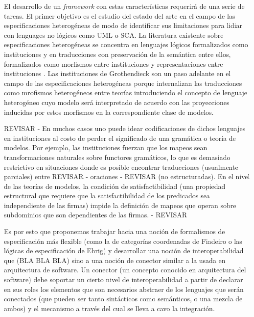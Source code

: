 \documentclass{article}
\begin{document}
  El desarrollo de un \emph{framework} con estas caracter\'isticas requerir\'a de una serie de tareas. El primer objetivo es el estudio del estado del arte en el campo de las especificaciones heterog\'eneas de modo de identificar sus limitaciones para lidiar con lenguages no l\'ogicos como UML o SCA. La literatura existente sobre especificaciones heterog\'eneas se concentra en lenguajes l\'ogicos formalizados como instituciones \cite{goguen:cmwlp84} y en traducciones con preservaci\'on de la sem\'antica entre ellos, formalizados como morfismos entre instituciones \cite{goguen:jacm-39_1} y representaciones entre instituciones \cite{tarlecki:sadt-rtdts95}. Las instituciones de Grothendieck \cite{diaconescu:acs-10_4} son un paso adelante en el campo de las especificaciones heterog\'eneas porque internalizan las traducciones como mrofismos heterog\'eneos entre teor\'ias introduciendo el concepto de lenguaje heterog\'eneo cuyo modelo ser\'a interpretado de acuerdo con las proyecciones inducidas por estos 
morfismos en la correspondiente clase de modelos.
  
  REVISAR -
  En muchos casos uno puede idear codificaciones de dichos lenguajes en instituciones al costo de perder el significado de una gram\'atica o teor\'ia de modelos. Por ejemplo, las instituciones fuerzan que los mapeos sean transformaciones naturales sobre functores gram\'aticos, lo que es demasiado restrictivo en situaciones donde es posible encontrar traducciones (usualmente parciales) entre REVISAR - oraciones - REVISAR (no estructuradas). En el nivel de las teor\'ias de modelos, la condici\'on de satisfactibilidad (una propiedad estructural que requiere que la satisfactibilidad de los predicados sea independiente de las firmas) impide la definici\'on de mapeos que operan sobre subdominios que son dependientes de las firmas.
  - REVISAR
  
  Es por esto que proponemos trabajar hacia una noci\'on de formalismos de especificaci\'on m\'as flexible (como la de categor\'ias coordenadas de Fiadeiro o las l\'ogicas de especificaci\'on de Ehrig) y desarrollar una noci\'on de interoperabilidad  que (BLA BLA BLA) sino a una noci\'on de conector similar a la usada en arquitectura de software. Un conector (un concepto conocido en arquitectura del software) debe soportar un cierto nivel de interoperabilidad a partir de declarar en sus roles los elementos que son necesarios abstraer de los lenguajes que ser\'an  conectados (que pueden ser tanto sint\'acticos como sem\'anticos, o una mezcla de ambos) y el mecanismo a trav\'es del cual se lleva a cavo la integraci\'on.
\end{document}
